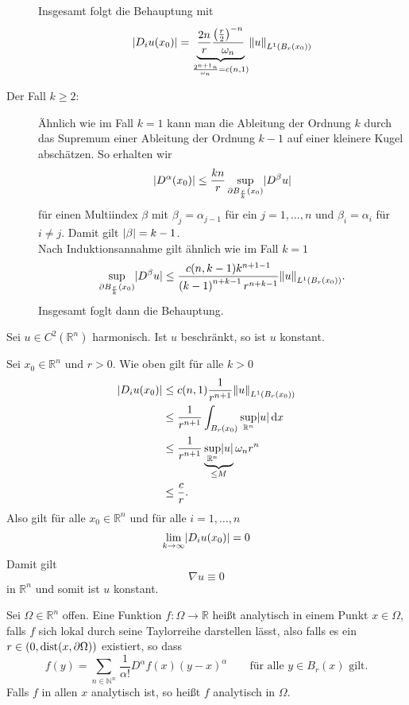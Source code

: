 \begin{beweis}
\begin{description}
		Insgesamt folgt die Behauptung mit
		\begin{equation}
			\abs{D_iu(x_0)}
			 = \underset{\frac{2^{n+1}n}{\omega_n}= c(n,1)}{\underbrace{\frac{2n}{r} \frac{\left( \frac{r}{2} \right)^{-n}}{\omega_n}}} \norm{u}_{L^1(B_r(x_0))}
		\end{equation}
		\item[Der Fall $k \geq 2$:]Ähnlich wie im Fall $k=1$ kann man die Ableitung der Ordnung $k$ durch das Supremum einer Ableitung der Ordnung $k-1$ auf einer
		kleinere Kugel abschätzen.
		So erhalten wir
		\[
			\lvert D^{\alpha}(x_0)\rvert \leq  \frac{kn}{r} \sup_{\partial B_{\frac{r}{k}}(x_0)} \lvert D^{\beta}u\rvert
		\]
		für einen Multiindex $\beta$ mit $\beta_j = \alpha_{j-1}$ für ein $j=1,\dots,n$ und $\beta_i = \alpha_i$ für $i \neq j$. Damit gilt $\lvert\beta\rvert= k-1$. \\
		Nach Induktionsannahme gilt ähnlich wie im Fall $k=1$
		\begin{equation}
			\sup_{\partial B_{\frac{r}{k}}(x_0)} \abs{D^{\beta}u} \leq \frac{c(n,k-1)k^{n+1-1}}{\left( k-1 \right)^{n+k-1}r^{n+k-1}} \norm{u}_{L^1(B_r(x_0))}.
		\end{equation}
		Insgesamt foglt dann die Behauptung.
	\end{description}
\end{beweis}

\begin{satz}
	Sei $u \in C^2(\mathbb{R}^n)$ harmonisch. Ist $u$ beschränkt, so ist $u$ konstant.
\end{satz}
\begin{beweis}
	Sei $x_0 \in \mathbb{R}^n$ und $r >0$. Wie oben gilt für alle $k > 0$
	\begin{align*}
		\abs{D_iu(x_0)} &\leq c(n,1) \frac{1}{r^{n+1}} \norm{u}_{L^1(B_r(x_0))} \\
		& \leq \frac{1}{r^{n+1}} \int_{B_r(x_0)}^{} \sup_{\mathbb{R}^n} \abs{u} \,\mathrm{d}x \\
		&\leq \frac{1}{r^{n+1}}\, \underset{\leq M}{\underbrace{\sup_{\mathbb{R}^n}\abs{u}}} \,\omega_n r^n \\
		&\leq \frac{c}{r}.
	\end{align*}
	Also gilt für alle $x_0 \in \mathbb{R}^n$ und für alle $i=1,\dots,n$
	\[
		\lim_{k \to \infty}\lvert D_iu(x_0)\rvert = 0
	\]
	Damit gilt 
	\[
		 \nabla u \equiv 0 
	\]
	in $\mathbb{R}^n$ und somit ist $u$ konstant.
\end{beweis}

\begin{definition}
	Sei $\Omega \in \mathbb{R}^n$ offen. Eine Funktion $f : \Omega \to \mathbb{R}$ heißt analytisch in einem Punkt $x \in \Omega$, 
	falls $f$ sich lokal durch seine Taylorreihe darstellen lässt, also falls es ein $r \in (0, \operatorname{dist}(x,\partial \Omega))$ existiert, so dass
	\begin{equation}
		f(y) = \sum_{n \in \mathbb{N}^n}^{} \frac{}{} \frac{1}{\alpha !}D^{\alpha}f(x)(y-x)^{\alpha} \qquad \text{für alle }y \in B_r(x) \text{ gilt.}
	\end{equation}
	Falls $f$ in allen $x$ analytisch ist, so heißt $f$ analytisch in $\Omega$.
\end{definition}


